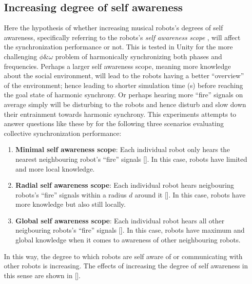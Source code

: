 	
	\subsection{Increasing degree of self awareness}
	
	Here the hypothesis of whether increasing musical robots's degrees of self awareness, specifically referring to the robots's \textit{self awareness scope} \cite{sacs17_ch3}, will affect the synchronization performance or not. This is tested in Unity for the more challenging $\phi \& \omega$ problem of harmonically synchronizing both phases and frequencies. Perhaps a larger self awareness scope, meaning more knowledge about the social environment, will lead to the robots having a better ``overview'' of the environment; hence leading to shorter simulation time (s) before reaching the goal state of harmonic synchrony. Or perhaps hearing more ``fire'' signals on average simply will be disturbing to the robots and hence disturb and slow down their entrainment towards harmonic synchrony. This experiments attempts to answer questions like these by for the following three scenarios evaluating collective synchronization performance:
	
	\begin{enumerate}
		\item \textbf{Minimal self awareness scope}: Each individual robot only hears the nearest neighbouring robot's ``fire'' signals []. In this case, robots have limited and more local knowledge.
		\item \textbf{Radial self awareness scope}: Each individual robot hears neigbouring robots's ``fire'' signals within a radius $d$ around it []. In this case, robots have more knowledge but also still locally.
		\item \textbf{Global self awareness scope}: Each individual robot hears all other neigbouring robots's ``fire'' signals []. In this case, robots have maximum and global knowledge when it comes to awareness of other neighbouring robots.
	\end{enumerate}
	
	In this way, the degree to which robots are self aware of or communicating with other robots is increasing. The effects of increasing the degree of self awareness in this sense are shown in [].
	
